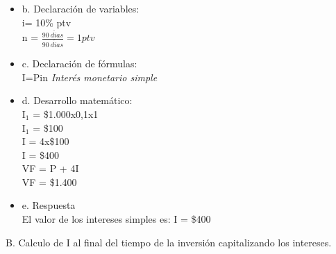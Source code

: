 \begin{itemize}
    \item b. Declaración de variables:\\
	
	i= 10\% ptv\\
	n = $\frac{90\ d\acute{i}as}{90\ d\acute{i}as} = 1 ptv $\\
	
	\item c. Declaración de fórmulas:\\
	I=Pin \hspace{35 pt}  \textit{Interés monetario simple}\\
	
	\item d. Desarrollo matemático:\\
	I$_{1}$ = \$1.000x0,1x1\\
	I$_{1}$ = \$100\\
	
	I = 4x\$100\\
	I = \$400\\
	
	VF = P + 4I\\
	VF = \$1.400\\
	
	\item e. Respuesta\\
El valor de los intereses simples es:	I = \$400\\
	
\end{itemize}

B. Calculo de I al final del tiempo de la inversión capitalizando los intereses.\\


